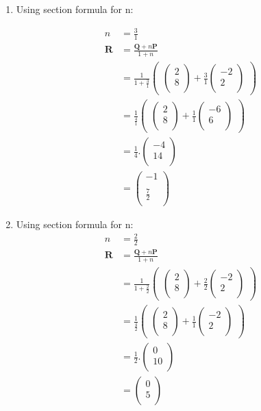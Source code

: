 \documentclass[12pt]{article}
\newcommand{\myvec}[1]{\ensuremath{\begin{pmatrix}#1\end{pmatrix}}}
\let\vec\mathbf
\begin{document}
\begin{enumerate}


\item Using section formula for n:
    
\begin{align}
n&=\frac{3}{1}\\
\vec{R}&=\frac{\vec{Q}+n\vec{P}}{1+n}\\
&=\frac{1}{1+\frac{3}{1}}  \myvec{\myvec{
2\\
8\\
}
  +
   \frac{3}{1}\myvec{
-2\\
2\\
}}\\
&= \frac{1}{\frac{4}{1}} \myvec{\myvec{
2\\
8\\
}
  +
\frac{1}{1}\myvec{
-6\\
6\\
}} \\
&=\frac{1}{4}.
\myvec{
-4\\
14\\
}\\
&=\myvec{
-1\\
\\
\frac{7}{2}\\
}
\end{align}

\item Using section formula for n:
\begin{align}
n&=\frac{2}{2}\\
\vec{R}&=\frac{\vec{Q}+n\vec{P}}{1+n}\\
&=\frac{1}{1+\frac{2}{2}}  \myvec{\myvec{
2\\
8\\
}
  +
   \frac{2}{2}\myvec{
-2\\
2\\
}}\\
&= \frac{1}{\frac{4}{2}} \myvec{\myvec{
2\\
8\\
}
  +
\frac{1}{1}\myvec{
-2\\
2\\
}} \\
&=\frac{1}{2}.
\myvec{
0\\
10\\
}\\
&=\myvec{
0\\
5\\
}
\end{align}


\end{enumerate}
\end{document}
